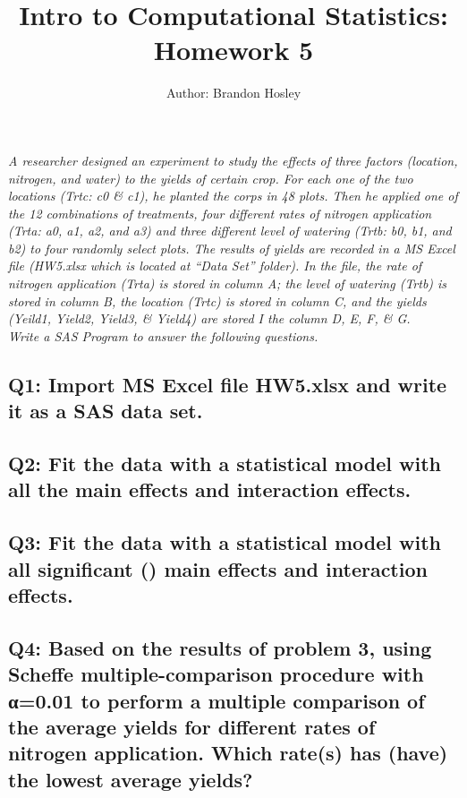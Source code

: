 \documentclass[a4paper,man,natbib]{apa6}
\title{Intro to Computational Statistics: Homework 5}
\author{Author: Brandon Hosley}
\affiliation{Instructor: Liang Kong, Ph.D}
\begin{document}
\maketitle
\singlespacing

\emph{A researcher designed an experiment to study the effects of three factors (location, nitrogen, and water) to the yields of certain crop. For each one of the two locations (Trtc: c0 \& c1), he planted the corps in 48 plots. Then he applied one of the 12 combinations of treatments, four different rates of nitrogen application (Trta: a0, a1, a2, and a3) and three different level of watering (Trtb: b0, b1, and b2) to four randomly select plots. The results of yields are recorded in a MS Excel file (HW5.xlsx which is located at “Data Set” folder). In the file, the rate of nitrogen application (Trta) is stored in column A; the level of watering (Trtb) is stored in column B, the location (Trtc) is stored in column C, and the yields (Yeild1, Yield2, Yield3, \& Yield4) are stored I the column D, E, F, \& G.
\\ Write a SAS Program to answer the following questions.
}
	
\subsection*{Q1: Import MS Excel file HW5.xlsx and write it as a SAS data set. }
% 

\subsection*{Q2: Fit the data with a statistical model with all the main effects and interaction effects. }
% 

\subsection*{Q3: Fit the data with a statistical model with all significant () main effects and interaction effects. }
% 

\subsection*{Q4: Based on the results of problem 3, using Scheffe multiple-comparison procedure with α=0.01 to perform a multiple comparison of the average yields for different rates of nitrogen application. Which rate(s) has (have) the lowest average yields? }
% 
\end{document}
